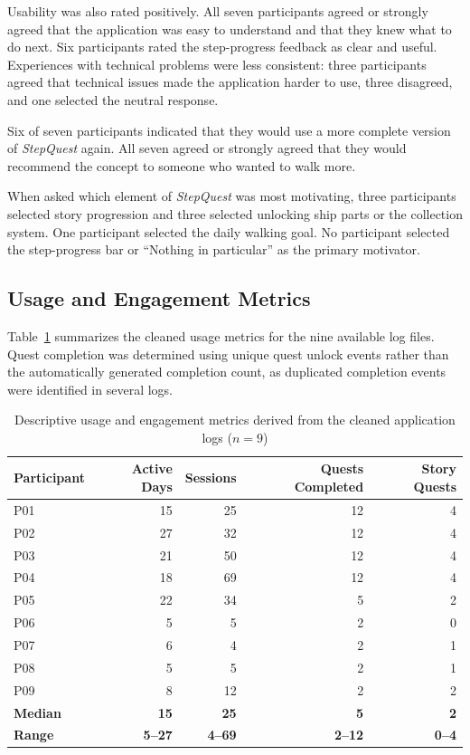 Usability was also rated positively. All seven participants agreed or strongly agreed that the application was easy to understand and that they knew what to do next. Six participants rated the step-progress feedback as clear and useful. Experiences with technical problems were less consistent: three participants agreed that technical issues made the application harder to use, three disagreed, and one selected the neutral response.

Six of seven participants indicated that they would use a more complete version of \textit{StepQuest} again. All seven agreed or strongly agreed that they would recommend the concept to someone who wanted to walk more.

When asked which element of \textit{StepQuest} was most motivating, three participants selected story progression and three selected unlocking ship parts or the collection system. One participant selected the daily walking goal. No participant selected the step-progress bar or ``Nothing in particular'' as the primary motivator.

\subsection{Usage and Engagement Metrics}

Table~\ref{tab:usage_engagement_metrics} summarizes the cleaned usage metrics for the nine available log files. Quest completion was determined using unique quest unlock events rather than the automatically generated completion count, as duplicated completion events were identified in several logs.

\begin{table}[h]
	\centering
	\caption{Descriptive usage and engagement metrics derived from the cleaned application logs ($n=9$)}
	\label{tab:usage_engagement_metrics}
	\begin{tabular}{lrrrr}
		\hline
		\textbf{Participant} & \textbf{Active Days} & \textbf{Sessions} & \textbf{Quests Completed} & \textbf{Story Quests} \\
		\hline
		P01 & 15 & 25 & 12 & 4 \\
		P02 & 27 & 32 & 12 & 4 \\
		P03 & 21 & 50 & 12 & 4 \\
		P04 & 18 & 69 & 12 & 4 \\
		P05 & 22 & 34 & 5  & 2 \\
		P06 & 5  & 5  & 2  & 0 \\
		P07 & 6  & 4  & 2  & 1 \\
		P08 & 5  & 5  & 2  & 1 \\
		P09 & 8  & 12 & 2  & 2 \\
		\hline
		\textbf{Median} & \textbf{15} & \textbf{25} & \textbf{5} & \textbf{2} \\
		\textbf{Range} & \textbf{5--27} & \textbf{4--69} & \textbf{2--12} & \textbf{0--4} \\
		\hline
	\end{tabular}
\end{table}

